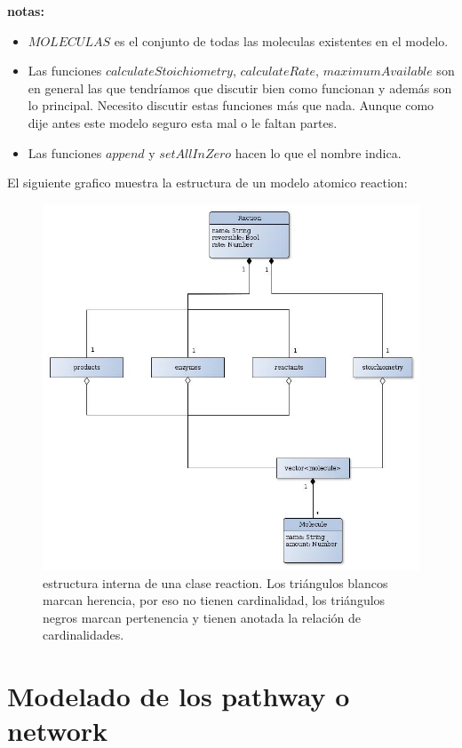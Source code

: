 \documentclass[12pt]{article}
\begin{document}
\textbf{notas:}\\
\begin{itemize}
\item $MOLECULAS$ es el conjunto de todas las moleculas existentes en el modelo.
\item Las funciones $calculateStoichiometry$, $calculateRate$, $maximumAvailable$ son en general las que tendríamos que discutir bien como funcionan y además son lo principal. Necesito discutir estas funciones más que nada. Aunque como dije antes este modelo seguro esta mal o le faltan partes.
\item Las funciones $append$ y $setAllInZero$ hacen lo que el nombre indica.
\end{itemize}

\newpage
El siguiente grafico muestra la estructura de un modelo atomico reaction:

\begin{figure}[h!]
 \centering
  \includegraphics[width=1\textwidth]{reaction.jpg}
 \caption{estructura interna de una clase reaction. Los triángulos blancos marcan herencia, por eso no tienen cardinalidad, los triángulos negros marcan pertenencia y tienen anotada la relación de cardinalidades.}
\end{figure}

\newpage
\section*{Modelado de los pathway o network}
\end{document}
